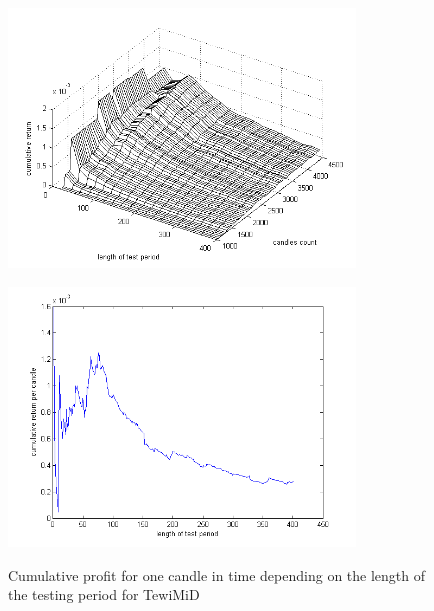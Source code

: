 \documentclass{tewiart}
\begin{document}
\begin{figure}[h!]
\centering
\begin{minipage}{.49\linewidth}
\begin{center}
\includegraphics[width=0.82\textwidth]{pictures/cumulativeReturnsPerCandleD.png}
\label{Cum3DPerCMiD}
\end{center}
\end{minipage}
\begin{minipage}{.49\linewidth}
\begin{center}
\includegraphics[width=0.82\textwidth]{pictures/mid_percandle_end.png}
\label{Cum3DPerCMiDend}
\end{center}
\end{minipage}
\caption{Cumulative profit for one candle in time depending on the length of the testing period for TewiMiD}
\end{figure}
\FloatBarrier
\end{document}
